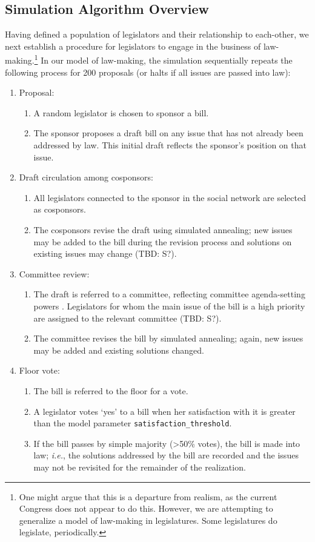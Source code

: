 \documentclass[pdftex,12pt,oribibl]{llncs}
\begin{document}
\subsection{Simulation Algorithm Overview}
Having defined a population of legislators and their relationship to each-other, we next establish a procedure for legislators to engage in the business of law-making.\footnote{One might argue that this is a departure from realism, as the current Congress does not appear to do this.
However, we are attempting to generalize a model of law-making in legislatures.
Some legislatures do legislate, periodically.}
In our model of law-making, the simulation sequentially repeats the following process for 200 proposals (or halts if all issues are passed into law):
\begin{enumerate}
\item Proposal:
\begin{enumerate}
\item A random legislator is chosen to sponsor a bill.
\item The sponsor proposes a draft bill on any issue that has not already been addressed by law. This initial draft reflects the sponsor's position on that issue.
\end{enumerate}
\item Draft circulation among cosponsors:
\begin{enumerate}
\item All legislators connected to the sponsor in the social network are selected as cosponsors.
\item The cosponsors revise the draft using simulated annealing; new issues may be added to the bill during the revision process and solutions on existing issues may change (TBD: S?).
\end{enumerate}
\item Committee review:
\begin{enumerate}
\item The draft is referred to a committee, reflecting committee agenda-setting powers \parencite{cm93, cm05}.
Legislators for whom the main issue of the bill is a high priority are assigned to the relevant committee (TBD: S?).
\item The committee revises the bill by simulated annealing; again, new issues may be added and existing solutions changed.
\end{enumerate}
\item Floor vote:
\begin{enumerate}
\item The bill is referred to the floor for a vote.
\item A legislator votes `yes' to a bill when her satisfaction with it is greater than the model parameter \texttt{satisfaction\_threshold}.
\item If the bill passes by simple majority (\textgreater 50\% votes), the bill is made into law; \textit{i.e.}, the solutions addressed by the bill are recorded and the issues may not be revisited for the remainder of the realization.
\end{enumerate}
\end{enumerate}
\end{document}
